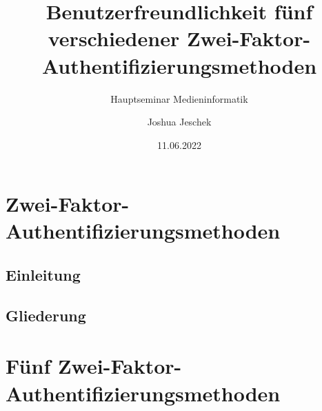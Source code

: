 \usepackage[T1]{fontenc}
\usepackage[utf8]{inputenc}
\usepackage[ngerman]{babel}
\usepackage{tikz}






\newcommand{\Title}{Benutzerfreundlichkeit fünf verschiedener Zwei-Faktor-Authentifizierungsmethoden}
\newcommand{\ShortTitle}{Zwei-Faktor-Authentifizierungsmethoden}
\title[\ShortTitle]{\Title}
\subtitle{Hauptseminar Medieninformatik}
\author{Joshua Jeschek}
\date{11.06.2022}



\tucthreeheadlines{}
\frame{\titlepage}

\tuctwoheadlines{}
\section*{\ShortTitle}
\subsection{Einleitung}


\subsection{Gliederung}

%
%

\section{Fünf Zwei-Faktor-Authentifizierungsmethoden}


